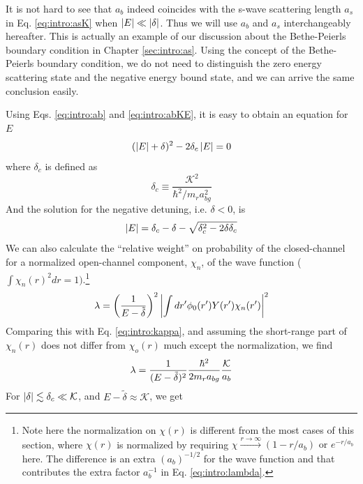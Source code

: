 It is not hard to see that $a_{b}$ indeed  coincides with the s-wave scattering length $a_{s}$ in Eq. \ref{eq:intro:asK} when $\left\lvert{E}\right\rvert\ll\left\lvert{\delta}\right\rvert$. Thus we will use $a_{b}$ and $a_{s}$ interchangeably hereafter. This is actually an example of our discussion about the Bethe-Peierls boundary condition in Chapter \ref{sec:intro:as}. Using the concept of the Bethe-Peierls boundary condition, we do not need to distinguish the zero energy scattering state and the negative energy bound state, and we can arrive the same conclusion easily.  

  Using Eqs. \ref{eq:intro:ab} and \ref{eq:intro:abKE}, it is easy to obtain an equation for $E$
\begin{equation}
(\left\lvert{E}\right\rvert+\delta)^{2}-2\delta_{c}\left\lvert{E}\right\rvert=0 
\end{equation}
where $\delta_{c}$ is defined as 
\begin{equation}\label{eq:intro:deltaC}
\delta_{c}\equiv\frac{\mathcal{K}^{2}}{\hbar^{2}/m_{r}a_{bg}^{2}}
\end{equation}
And the solution for the negative detuning, i.e. $\delta<0$, is
\begin{equation}\label{eq:intro:bindE}
\left\lvert{E}\right\rvert=\delta_{c}-\delta-\sqrt{\delta_{c}^{2}-2\delta\delta_{c}}
\end{equation}
We can also calculate the ``relative weight'' on probability of the closed-channel for a normalized open-channel component, $\chi_{n}$, of the wave function ($\int{}\chi_{n}(r)^{2}dr=1). $\footnote{Note here the normalization on $\chi(r)$ is different from the most cases of this section, where $\chi(r)$ is normalized by  requiring $\chi{}\overset{r\rightarrow\infty}\rightarrow{}(1-r/a_{b})\text{ or }e^{-r/a_{b}} $ here. The difference is an extra $(a_{b})^{-1/2}$ for the wave function and that contributes the extra factor $a_{b}^{-1}$ in Eq. \ref{eq:intro:lambda}.} 
\begin{equation}
\label{eq:intro:closeWeight}
\lambda=\left(\frac{1}{E-\tilde\delta}\right)^{2}\left\lvert{\int{}dr'\phi_{0}(r')Y(r')\chi_{n}(r')}\right\rvert^{2}
\end{equation}
Comparing this with Eq. \ref{eq:intro:kappa}, and assuming the short-range part of $\chi_{n}(r)$ does not differ from $\chi_{o}(r)$ much except the normalization, we  find 
\begin{equation}\label{eq:intro:lambda}
\lambda=\frac{1}{(E-\tilde\delta)^{2}}\frac{\hbar^{2}}{2m_{r}a_{bg}}\frac{\mathcal{K}}{a_{b}}
\end{equation}
For $\left\lvert{\delta}\right\rvert\lesssim\delta_{c}\ll\mathcal{K}$,  and $E-\tilde\delta\approx\mathcal{K}$, we get 
